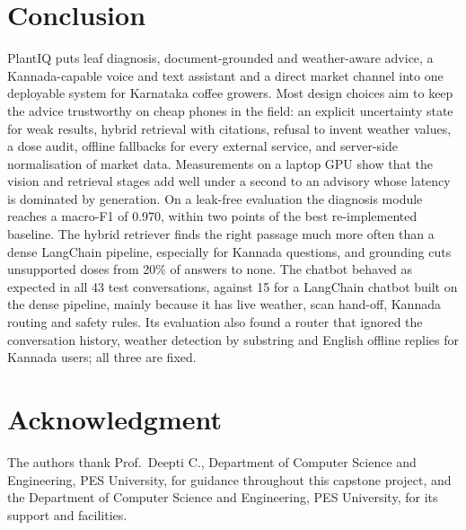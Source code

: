 \section{Conclusion}
PlantIQ puts leaf diagnosis, document-grounded and weather-aware advice, a Kannada-capable voice and text
assistant and a direct market channel into one deployable system for Karnataka coffee growers. Most design choices aim
to keep the advice trustworthy on cheap phones in the field: an explicit uncertainty state for weak results, hybrid retrieval with citations, refusal to invent weather values, a dose audit, offline fallbacks for every
external service, and server-side normalisation of market data. Measurements on a laptop GPU show that the vision and
retrieval stages add well under a second to an advisory whose latency is dominated by generation.
On a leak-free evaluation the diagnosis module reaches a macro-F1 of 0.970, within two points of the best
re-implemented baseline. The hybrid retriever finds the right passage much more often than a dense LangChain
pipeline, especially for Kannada questions, and grounding cuts unsupported doses from 20\% of answers to none. The chatbot behaved as expected in all 43 test conversations, against 15 for a LangChain chatbot built on the dense
pipeline, mainly because it has live weather, scan hand-off, Kannada routing and safety rules. Its evaluation also found
a router that ignored the conversation history, weather detection by substring and English offline replies for Kannada
users; all three are fixed.

\section*{Acknowledgment}
The authors thank Prof.\ Deepti C., Department of Computer Science and Engineering, PES University, for guidance
throughout this capstone project, and the Department of Computer Science and Engineering, PES University, for its
support and facilities.

\providecommand{\plantiqbalancerefs}{}\plantiqbalancerefs
\ifdefined\plantiqusebibtex


\else

\fi



